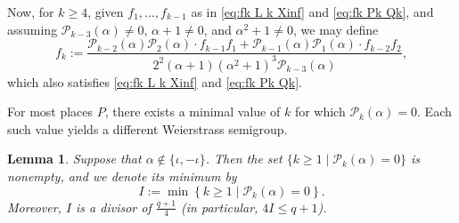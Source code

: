 \documentclass[12pt]{amsart}
\newtheorem{lemma}[theorem]{Lemma}
\theoremstyle{remark}
\theoremstyle{definition}
\newcommand{\coloneqq}{\mathrel{:=}}
\begin{document}
Now, for $k \geq 4$, given $f_{1}, \ldots, f_{k-1}$ as in
\eqref{eq:fk L k Xinf} and \eqref{eq:fk Pk Qk}, and assuming
$\mathcal{P}_{k-3}(\alpha) \neq 0$, $\alpha + 1 \neq 0$, and
$\alpha^{2} + 1 \neq 0$, we may define
\[
    f_{k} \coloneqq
    \frac{\mathcal{P}_{k-2}(\alpha)\mathcal{P}_{2}(\alpha) \cdot f_{k-1}f_{1}
          + \mathcal{P}_{k-1}(\alpha)\mathcal{P}_{1}(\alpha) \cdot f_{k-2}f_{2}}
         {2^{2}(\alpha+1)(\alpha^{2}+1)^{3}\mathcal{P}_{k-3}(\alpha)},
\]
which also satisfies \eqref{eq:fk L k Xinf} and \eqref{eq:fk Pk Qk}.

For most places $P$, there exists a minimal value of $k$ for which
$\mathcal{P}_{k}(\alpha) = 0$. Each such value yields a different Weierstrass
semigroup.
\begin{lemma}\label{lem:I min Pk}
    Suppose that $\alpha \notin \{\iota, -\iota\}$. Then the set
    $\{k \ge 1 \mid \mathcal{P}_{k}(\alpha) = 0\}$ is nonempty, and we denote
    its minimum by
    \[
        I \coloneqq \min\left\{ k \ge 1 \mid \mathcal{P}_{k}(\alpha) = 0 \right\}.
    \]
    Moreover, $I$ is a divisor of $\frac{q+1}{4}$ (in particular,
    $4I \le q+1$).
\end{lemma}
\end{document}
